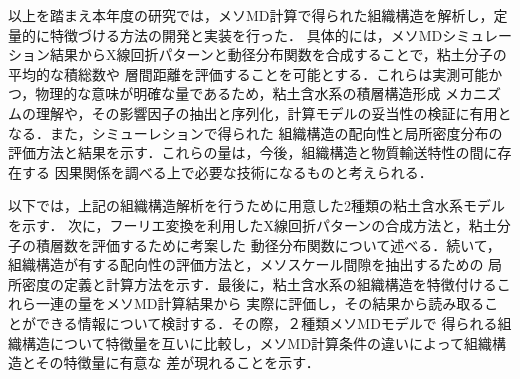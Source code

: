 以上を踏まえ本年度の研究では，メソMD計算で得られた組織構造を解析し，定量的に特徴づける方法の開発と実装を行った．
具体的には，メソMDシミュレーション結果からX線回折パターンと動径分布関数を合成することで，粘土分子の平均的な積総数や
層間距離を評価することを可能とする．これらは実測可能かつ，物理的な意味が明確な量であるため，粘土含水系の積層構造形成
メカニズムの理解や，その影響因子の抽出と序列化，計算モデルの妥当性の検証に有用となる．また，シミューレションで得られた
組織構造の配向性と局所密度分布の評価方法と結果を示す．これらの量は，今後，組織構造と物質輸送特性の間に存在する
因果関係を調べる上で必要な技術になるものと考えられる．

以下では，上記の組織構造解析を行うために用意した2種類の粘土含水系モデルを示す．
次に，フーリエ変換を利用したX線回折パターンの合成方法と，粘土分子の積層数を評価するために考案した
動径分布関数について述べる．続いて，組織構造が有する配向性の評価方法と，メソスケール間隙を抽出するための
局所密度の定義と計算方法を示す．最後に，粘土含水系の組織構造を特徴付けるこれら一連の量をメソMD計算結果から
実際に評価し，その結果から読み取ることができる情報について検討する．その際，２種類メソMDモデルで
得られる組織構造について特徴量を互いに比較し，メソMD計算条件の違いによって組織構造とその特徴量に有意な
差が現れることを示す．


